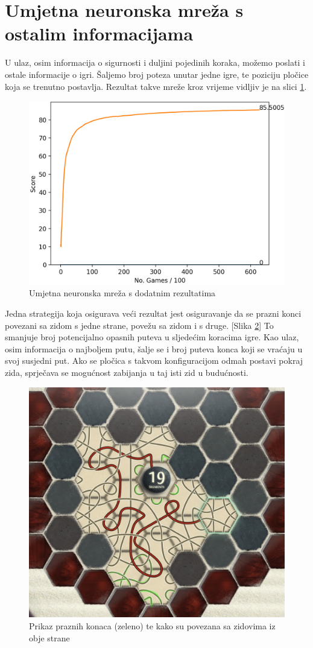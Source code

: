 \documentclass[zavrsnirad]{fer}
\begin{document}
\section{Umjetna neuronska mreža s ostalim informacijama}
\label{pog:neuronska_ostale}
U ulaz, osim informacija o sigurnosti i duljini pojedinih koraka, možemo poslati i ostale informacije o igri. Šaljemo broj poteza unutar jedne igre, te poziciju pločice koja se trenutno postavlja. Rezultat takve mreže kroz vrijeme vidljiv je na slici \ref{slk:neural_meta}. 

\begin{figure}[htb]
	\centering
	\includegraphics[width=0.58\linewidth]{Figures/dodatna.png} 
	\caption{Umjetna neuronska mreža s dodatnim rezultatima}
	\label{slk:neural_meta}
\end{figure}

Jedna strategija koja osigurava veći rezultat jest osiguravanje da se prazni konci povezani sa zidom s jedne strane, povežu sa zidom i s druge. [Slika \ref{slk:neural_loops}] To smanjuje broj potencijalno opasnih puteva u sljedećim koracima igre. Kao ulaz, osim informacija o najboljem putu, šalje se i broj puteva konca koji se vraćaju u svoj susjedni put. Ako se pločica s takvom konfiguracijom odmah postavi pokraj zida, sprječava se mogućnost zabijanja u taj isti zid u budućnosti. 

\begin{figure}[htb]
	\centering
	\includegraphics[width=0.48\linewidth]{Figures/loops.png} 
	\caption{Prikaz praznih konaca (zeleno) te kako su povezana sa zidovima iz obje strane}
	\label{slk:neural_loops}
\end{figure}
\end{document}
